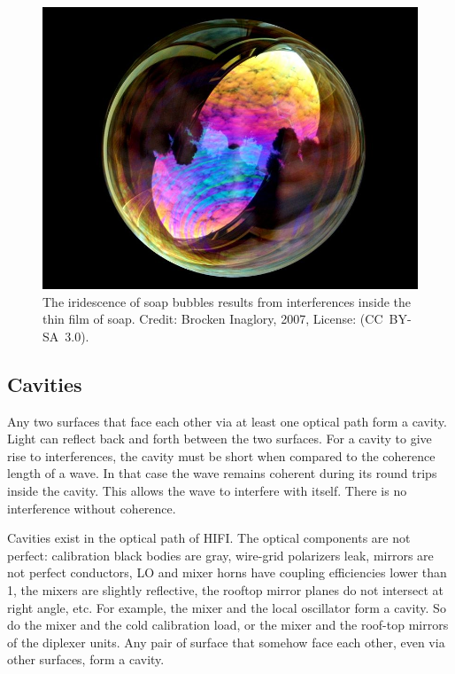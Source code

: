\begin{figure}
    \centering
    \includegraphics[width=.8\textwidth]{soap_bubble_sky}
    \caption{The iridescence of soap bubbles results from interferences inside the thin film of soap.
    Credit: Brocken Inaglory, 2007, License: (CC~BY-SA~3.0).
}
    \label{fig:soap_bubble}
\end{figure}


\subsection{Cavities}

Any two surfaces that face each other via at least one optical path form a cavity.
Light can reflect back and forth between the two surfaces.
For a cavity to give rise to interferences, the cavity must be short when compared to the coherence length of a wave.
In that case the wave remains coherent during its round trips inside the cavity.
This allows the wave to interfere with itself.
There is no interference without coherence.

Cavities exist in the optical path of HIFI.
The optical components are not perfect: calibration black bodies are gray, wire-grid polarizers leak, mirrors are not perfect conductors, LO and mixer horns have coupling efficiencies lower than 1, the mixers are slightly reflective, the rooftop mirror planes do not intersect at right angle, etc.
For example, the mixer and the local oscillator form a cavity.
So do the mixer and the cold calibration load, or the mixer and the roof-top mirrors of the diplexer units.
Any pair of surface that somehow face each other, even via other surfaces, form a cavity.

